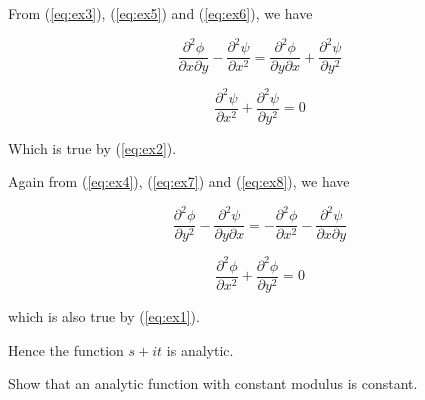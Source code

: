 \begin{solution}
From (\ref{eq:ex3}), (\ref{eq:ex5}) and (\ref{eq:ex6}), we have 

\[
\frac{\partial^{2}\phi}{\partial x\partial y}-\frac{\partial^{2}\psi}{\partial x^{2}}=\frac{\partial^{2}\phi}{\partial y\partial x}+\frac{\partial^{2}\psi}{\partial y^{2}}\]


\[
\frac{\partial^{2}\psi}{\partial x^{2}}+\frac{\partial^{2}\psi}{\partial y^{2}}=0\]


Which is true by (\ref{eq:ex2}).

Again from (\ref{eq:ex4}), (\ref{eq:ex7}) and (\ref{eq:ex8}), we
have 

\[
\frac{\partial^{2}\phi}{\partial y^{2}}-\frac{\partial^{2}\psi}{\partial y\partial x}=-\frac{\partial^{2}\phi}{\partial x^{2}}-\frac{\partial^{2}\psi}{\partial x\partial y}\]


\[
\frac{\partial^{2}\phi}{\partial x^{2}}+\frac{\partial^{2}\phi}{\partial y^{2}}=0\]


which is also true by (\ref{eq:ex1}).

Hence the function $s+it$ is analytic.

\end{solution}

\begin{example}

Show that an analytic function with constant modulus is constant.

\end{example}

